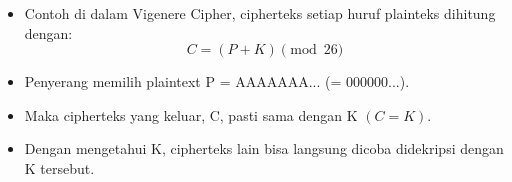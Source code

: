 \documentclass{article}
\begin{document}

\begin{itemize}
    \item Contoh di dalam Vigenere Cipher, cipherteks setiap huruf plainteks dihitung dengan:
    \[ C = (P + K) \pmod{26} \]
    \item Penyerang memilih plaintext P = AAAAAAA... (= 000000...).
    \item Maka cipherteks yang keluar, C, pasti sama dengan K $(C = K)$.
    \item Dengan mengetahui K, cipherteks lain bisa langsung dicoba didekripsi dengan K tersebut.
\end{itemize}
\end{document}
